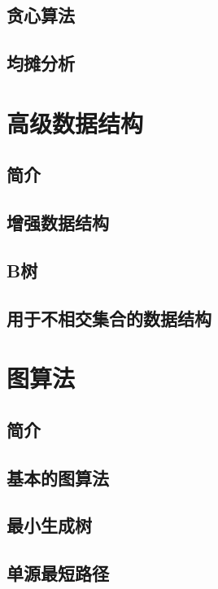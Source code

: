 \documentclass[lang=cn,newtx,10pt,scheme=chinese]{elegantbook}
\begin{document}
\chapter{贪心算法}

\chapter{均摊分析}

\part{高级数据结构}

\chapter*{简介}

\chapter{增强数据结构}

\chapter{B树}

\chapter{用于不相交集合的数据结构}

\part{图算法}

\chapter*{简介}

\chapter{基本的图算法}

\chapter{最小生成树}

\chapter{单源最短路径}
\end{document}
